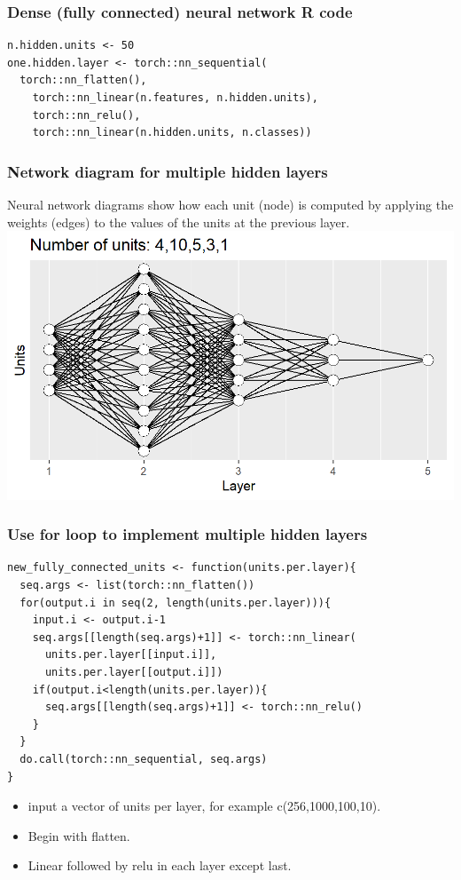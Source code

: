 \documentclass{beamer}
\begin{document}
\begin{frame}[fragile]
  \frametitle{Dense (fully connected) neural network R code}
\begin{verbatim}
n.hidden.units <- 50
one.hidden.layer <- torch::nn_sequential(
  torch::nn_flatten(),
    torch::nn_linear(n.features, n.hidden.units),
    torch::nn_relu(),
    torch::nn_linear(n.hidden.units, n.classes))
\end{verbatim}
\end{frame}

\begin{frame}
  \frametitle{Network diagram for multiple hidden layers}
  Neural network
  diagrams show how each unit (node) is computed by applying the
  weights (edges) to the values of the units at the previous layer.
\includegraphics[width=\textwidth]{figure-architecture-fiveLayers}
\end{frame}

\begin{frame}[fragile]
  \frametitle{Use for loop to implement multiple hidden layers}
\begin{verbatim}
new_fully_connected_units <- function(units.per.layer){
  seq.args <- list(torch::nn_flatten())
  for(output.i in seq(2, length(units.per.layer))){
    input.i <- output.i-1
    seq.args[[length(seq.args)+1]] <- torch::nn_linear(
      units.per.layer[[input.i]], 
      units.per.layer[[output.i]])
    if(output.i<length(units.per.layer)){
      seq.args[[length(seq.args)+1]] <- torch::nn_relu()
    }
  }
  do.call(torch::nn_sequential, seq.args)
}
\end{verbatim}
  \begin{itemize}
  \item input a vector of units per layer, for example c(256,1000,100,10).
  \item Begin with flatten.
  \item Linear followed by relu in each layer except last.
  \end{itemize}
\end{frame}
 
\end{document}
